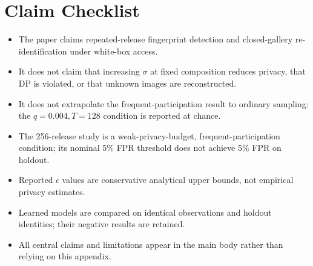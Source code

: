 \documentclass[conference]{IEEEtran}
\begin{document}
\section{Claim Checklist}

\begin{itemize}
  \item The paper claims repeated-release fingerprint detection and closed-gallery re-identification under white-box access.
  \item It does not claim that increasing $\sigma$ at fixed composition reduces privacy, that DP is violated, or that unknown images are reconstructed.
  \item It does not extrapolate the frequent-participation result to ordinary sampling: the $q=0.004,T=128$ condition is reported at chance.
  \item The 256-release study is a weak-privacy-budget, frequent-participation condition; its nominal 5\% FPR threshold does not achieve 5\% FPR on holdout.
  \item Reported $\epsilon$ values are conservative analytical upper bounds, not empirical privacy estimates.
  \item Learned models are compared on identical observations and holdout identities; their negative results are retained.
  \item All central claims and limitations appear in the main body rather than relying on this appendix.
\end{itemize}
\end{document}
